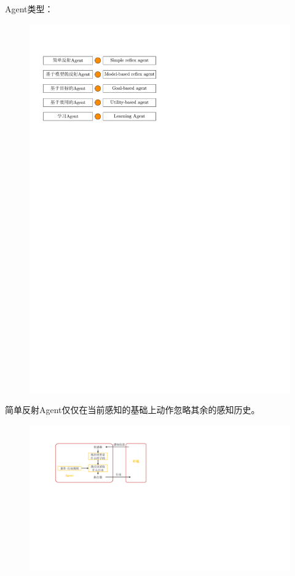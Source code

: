 Agent类型：
\begin{figure}[htbp]
    \centering
    \includegraphics{image/Agent类型.pdf}
\end{figure}

\begin{definition}[简单反射Agent]
    简单反射Agent仅仅在当前感知的基础上动作忽略其余的感知历史。
\end{definition}
\begin{figure}[htbp]
    \centering
    \includegraphics{image/简单反射Agent.pdf}
\end{figure}

